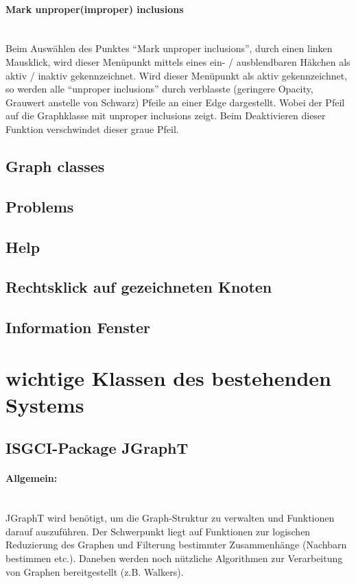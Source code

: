 \documentclass[10pt,a4paper]{article}
\begin{document}
\paragraph{Mark unproper(improper) inclusions}\ \\
Beim Auswählen des Punktes "`Mark unproper inclusions"', durch einen linken Mausklick, wird dieser Menüpunkt mittels eines ein- / ausblendbaren Häkchen als aktiv / inaktiv gekennzeichnet. Wird dieser Menüpunkt als aktiv gekennzeichnet, so werden alle "`unproper inclusions"' durch verblasste (geringere Opacity, Grauwert anstelle von Schwarz) Pfeile an einer Edge dargestellt. Wobei der Pfeil auf die Graphklasse mit unproper inclusions zeigt. Beim Deaktivieren dieser Funktion verschwindet dieser graue Pfeil.


\subsection{Graph classes}
\subsection{Problems}
\subsection{Help}
\subsection{Rechtsklick auf gezeichneten Knoten}
\subsection{Information Fenster}

\section{wichtige Klassen des bestehenden Systems}
\subsection{ISGCI-Package JGraphT}

\paragraph{Allgemein:}\ \\
JGraphT wird benötigt, um die Graph-Struktur zu verwalten und Funktionen darauf auszuführen. Der Schwerpunkt liegt auf Funktionen zur logischen Reduzierung des Graphen und Filterung bestimmter Zusammenhänge (Nachbarn bestimmen etc.). Daneben werden noch nützliche Algorithmen zur Verarbeitung von Graphen bereitgestellt (z.B. Walkers).\\
\end{document}
